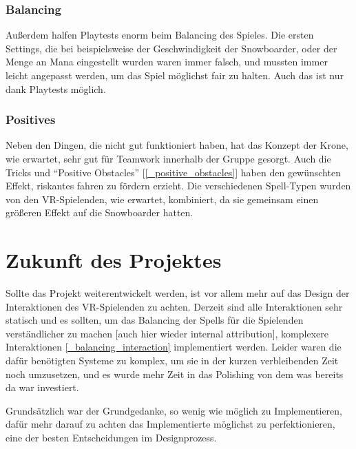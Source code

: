 \subsubsection{Balancing}

Außerdem halfen Playtests enorm beim Balancing des Spieles. Die ersten Settings, die bei beispielsweise der Geschwindigkeit der Snowboarder, oder der Menge an Mana eingestellt wurden waren immer falsch, und mussten immer leicht angepasst werden, um das Spiel möglichst fair zu halten. Auch das ist nur dank Playtests möglich.

\subsubsection{Positives}

Neben den Dingen, die nicht gut funktioniert haben, hat das Konzept der Krone, wie erwartet, sehr gut für Teamwork innerhalb der Gruppe gesorgt. Auch die Tricks und "`Positive Obstacles"' [\ref{_positive_obstacles}] haben den gewünschten Effekt, riskantes fahren zu fördern erzieht. Die verschiedenen Spell-Typen wurden von den VR-Spielenden, wie erwartet, kombiniert, da sie gemeinsam einen größeren Effekt auf die Snowboarder hatten.

\section{Zukunft des Projektes}

Sollte das Projekt weiterentwickelt werden, ist vor allem mehr auf das Design der Interaktionen des VR-Spielenden zu achten. Derzeit sind alle Interaktionen sehr statisch und es sollten, um das Balancing der Spells für die Spielenden verständlicher zu machen [auch hier wieder internal attribution], komplexere Interaktionen \ref{_balancing_interaction} implementiert werden. Leider waren die dafür benötigten Systeme zu komplex, um sie in der kurzen verbleibenden Zeit noch umzusetzen, und es wurde mehr Zeit in das Polishing von dem was bereits da war investiert.

Grundsätzlich war der Grundgedanke, so wenig wie möglich zu Implementieren, dafür mehr darauf zu achten das Implementierte möglichst zu perfektionieren, eine der besten Entscheidungen im Designprozess.
